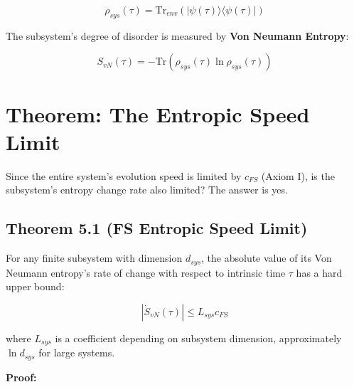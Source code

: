 \documentclass[11pt,a4paper,twoside]{book}
\begin{document}
$$\rho_{sys}(\tau) = \text{Tr}_{env} (|\psi(\tau)\rangle \langle \psi(\tau)|)$$

The subsystem's degree of disorder is measured by \textbf{Von Neumann Entropy}:

$$S_{vN}(\tau) = -\text{Tr}(\rho_{sys}(\tau) \ln \rho_{sys}(\tau))$$

\section{Theorem: The Entropic Speed Limit}

Since the entire system's evolution speed is limited by \textbf{$c_{FS}$} (Axiom I), is the subsystem's entropy change rate also limited? The answer is yes.

\subsection{Theorem 5.1 (FS Entropic Speed Limit)}

For any finite subsystem with dimension \textbf{$d_{sys}$}, the absolute value of its Von Neumann entropy's rate of change with respect to intrinsic time \textbf{$\tau$} has a hard upper bound:

$$|\dot{S}_{vN}(\tau)| \le L_{sys} c_{FS}$$

where \textbf{$L_{sys}$} is a coefficient depending on subsystem dimension, approximately \textbf{$\ln d_{sys}$} for large systems.

\textbf{Proof:}
\end{document}
